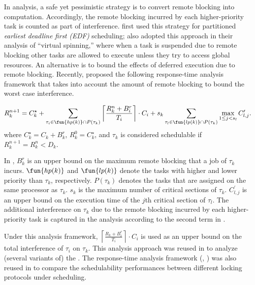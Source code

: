 In analysis, a safe yet pessimistic strategy is to convert remote blocking into computation. Accordingly, the remote blocking incurred by each higher-priority task is counted as part of interference. \citet{block-2007} first used this strategy for partitioned \emph{earliest deadline first (EDF)} scheduling;  \citet{lakshmanan-2009} also adopted this approach in their analysis of ``virtual spinning,'' where when a task is suspended due to remote blocking other tasks are allowed to execute unless they try to access global resources. An alternative is to bound the effects of deferred execution due to remote blocking. Recently, \citet{lakshmanan-2009} proposed the following response-time analysis framework that takes into account the amount of remote blocking to bound the worst case interference.

\begin{align}
\label{eq:wcrt}
R_k^{n+1} = C_k^{\star} + \sum_{\tau_i \in \fun{hp(k)} \cap P(\tau_k)} \left \lceil \frac{R_k^n + B_i^r}{T_i} \right \rceil \cdot C_i + s_k \sum_{\tau_l \in \fun{lp(k)} \cap P(\tau_k)} \max_{1 \leq j < s_l} C_{l,j}^{\prime}.  
\end{align}
where $C_k^{\star} = C_k + B_k^r$, $R_k^0 = C_k^{\star}$, and $\tau_k$ is considered schedulable if $R_k^{n+1} = R_k^n < D_k$. 

In , $B_k^r$ is an upper bound on the maximum remote blocking that a job of $\tau_k$ incurs. $\fun{hp(k)}$ and $\fun{lp(k)}$ denote the tasks with higher and lower priority than $\tau_k$, respectively. $P(\tau_k)$ denotes the tasks that are assigned on the same processor as $\tau_k$. $s_k$ is the maximum number of critical sections of $\tau_k$. $C_{l,j}^{\prime}$ is an upper bound on the execution time of the $j$th critical section of $\tau_l$. The additional interference on $\tau_k$ due to the remote blocking incurred by each higher-priority task is captured in the analysis according to the second term in .

Under this analysis framework, $\left \lceil \frac{R_k + B_i^r}{T_i} \right \rceil \cdot C_i$ is used as an upper bound on the total interference of $\tau_i$ on $\tau_k$. This analysis approach was reused in \cite{yang-2013,kim-2014,carminati-2014,yang-2014} to analyze (several variants of) the \mpcp. The response-time analysis framework (\ie, ) was also reused in \cite{zeng-2011,bbb-2013,han-2014} to compare the schedulability performances between different locking protocols under \pfp scheduling. 

